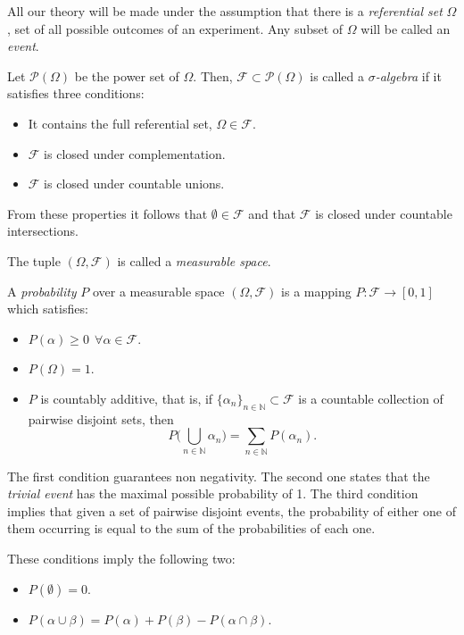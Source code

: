 
All our theory will be made under the assumption that there is a
\emph{referential set} \(\Omega\), set of all possible outcomes of an experiment. Any subset of
\(\Omega\) will be called an \emph{event}.

\begin{definition}
Let \(\mathcal{P}(\Omega)\) be the power set of \(\Omega\). Then, \(\mathcal{F} \subset \mathcal{P}(\Omega)\) is called a
\emph{\(\sigma\)-algebra} if it satisfies three conditions:
\begin{itemize}
\item It contains the full referential set, \(\Omega \in \mathcal{F}\).
\item \(\mathcal{F}\) is closed under complementation.
\item \(\mathcal{F}\) is closed under countable unions.
\end{itemize}
From these properties it follows that \(\emptyset \in \mathcal{F}\) and that \(\mathcal{F}\)
is closed under countable intersections.

The tuple \((\Omega, \mathcal{F})\) is called a \emph{measurable space}.
\end{definition}

\begin{definition}
A \emph{probability} \(P\) over a measurable space \((\Omega, \mathcal{F})\) is a mapping
\(P: \mathcal{F} \to [0,1]\) which satisfies:
\begin{itemize}
\item \(P(\alpha) \geq 0 \ \ \forall \alpha \in \mathcal{F}\).
\item \(P(\Omega) = 1\).
\item \(P\) is countably additive, that is, if \(\{\alpha_n\}_{n \in \mathbb{N}}
  \subset \mathcal{F}\) is a countable collection of pairwise disjoint sets,
  then
  \[
  P\Big(\bigcup_{n\in \mathbb{N}}\alpha_n \Big) = \sum_{n \in \mathbb{N}}P(\alpha_n).
  \]
\end{itemize}
\end{definition}

The first condition guarantees non negativity. The second one states that the
\emph{trivial event} has the maximal possible probability of 1.
The third condition implies that given a set of pairwise disjoint events,
the probability of either one of them occurring is equal to the sum of the
probabilities of each one.

These conditions imply the following two:
\begin{itemize}
\item \(P(\emptyset) = 0\).
\item \(P(\alpha \cup \beta) = P(\alpha) + P(\beta) - P(\alpha \cap \beta)\).
\end{itemize}


